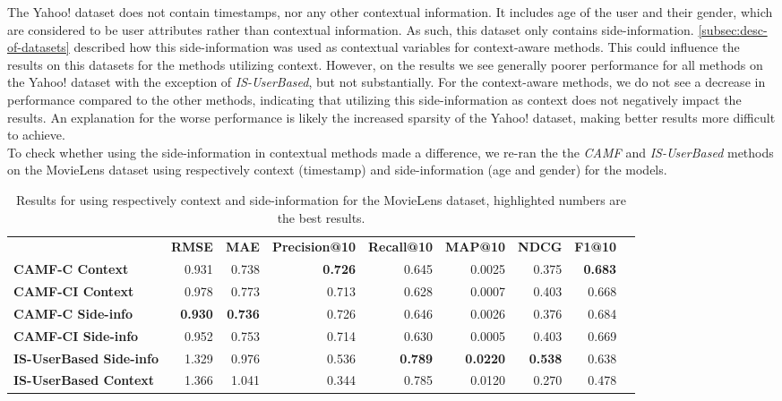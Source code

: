 The Yahoo! dataset does not contain timestamps, nor any other contextual information.
It includes age of the user and their gender, which are considered to be user attributes rather than contextual information.
As such, this dataset only contains side-information.
\autoref{subsec:desc-of-datasets} described how this side-information was used as contextual variables for context-aware methods.
This could influence the results on this datasets for the methods utilizing context.
However, on the results we see generally poorer performance for all methods on the Yahoo! dataset with the exception of \textit{IS-UserBased}, but not substantially.
For the context-aware methods, we do not see a decrease in performance compared to the other methods, indicating that utilizing this side-information as context does not negatively impact the results.
An explanation for the worse performance is likely the increased sparsity of the Yahoo! dataset, making better results more difficult to achieve.\\
To check whether using the side-information in contextual methods made a difference, we re-ran the the \textit{CAMF} and \textit{IS-UserBased} methods on the MovieLens dataset using respectively context (timestamp) and side-information (age and gender) for the models.
\begin{table*}[!htp]\centering
    \caption{Results for using respectively context and side-information for the MovieLens dataset, highlighted numbers are the best results.}\label{tab:movielenscontextsideinfo}
    \scriptsize
    \begin{tabular}{lrrrrrrrr}\toprule
    &\textbf{RMSE} &\textbf{MAE} &\textbf{Precision@10} &\textbf{Recall@10} &\textbf{MAP@10} &\textbf{NDCG} &\textbf{F1@10} \\\cmidrule{2-8}
    \textbf{CAMF-C Context} &0.931 &0.738 &\textbf{0.726} &0.645 &0.0025 &0.375 &\textbf{0.683} \\\cmidrule{1-8}
    \textbf{CAMF-CI Context} &0.978 &0.773 &0.713 &0.628 &0.0007 &0.403 &0.668 \\\cmidrule{1-8}
    \textbf{CAMF-C Side-info} &\textbf{0.930} &\textbf{0.736} &0.726 &0.646 &0.0026 &0.376 &0.684 \\\cmidrule{1-8}
    \textbf{CAMF-CI Side-info} &0.952 &0.753 &0.714 &0.630 &0.0005 &0.403 &0.669 \\\cmidrule{1-8}
    \textbf{IS-UserBased Side-info} &1.329 &0.976 &0.536 &\textbf{0.789} &\textbf{0.0220} &\textbf{0.538} &0.638 \\\cmidrule{1-8}
    \textbf{IS-UserBased Context} &1.366 &1.041 &0.344 &0.785 &0.0120 &0.270 &0.478 \\\cmidrule{1-8}
    \bottomrule
    \end{tabular}
\end{table*}
